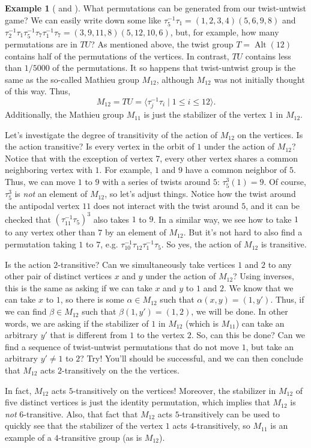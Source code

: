 \documentclass[11pt]{amsart}
\theoremstyle{plain}
\theoremstyle{definition}
\newtheorem{example}{Example}
\theoremstyle{remark}
\DeclareMathOperator{\Alt}{Alt}
\begin{document}
\begin{example}[{\cite[Section~18 of Chapter~11]{CoSl99} and \cite{NaB-Icosa}}]
What permutations can be generated from our twist-untwist game? We can easily write down some like $\tau_5^{-1}\tau_1 = (1,2,3,4)(5,6,9,8)$ and $\tau_2^{-1}\tau_1\tau_5^{-1}\tau_7\tau_1^{-1}\tau_7 = (3,9,11,8)(5,12,10,6)$, but, for example, how many permutations are in $TU$? As mentioned above, the twist group $T = \Alt(12)$ contains half of the permutations of the vertices. In contrast, $TU$ contains less than $1/5000$ of the permutations. It so happens that twist-untwist group is the same as the so-called Mathieu group $M_{12}$, although $M_{12}$ was not initially thought of this way. Thus,  
 \[M_{12} = TU = \langle \tau_j^{-1}\tau_i \mid 1\le i\le 12\rangle.\]
Additionally, the Mathieu group $M_{11}$ is just the stabilizer of the vertex $1$ in $M_{12}$.

Let's investigate the degree of transitivity of the action of $M_{12}$ on the vertices. Is the action transitive? Is every vertex in the orbit of $1$ under the action of $M_{12}$? Notice that with the exception of vertex $7$, every other vertex shares a common neighboring vertex with $1$. For example, $1$ and $9$ have a common neighbor of $5$. Thus, we can move $1$ to $9$ with a series of twists around $5$: $\tau_5^3(1) = 9$. Of course, $\tau_5^3$ is \emph{not} an element of $M_{12}$, so let's adjust things. Notice how the twist around the antipodal vertex $11$ does not interact with the twist around $5$, and it can be checked that $(\tau_{11}^{-1}\tau_5)^3$ also takes $1$ to $9$. In a similar way, we see how to take $1$ to any vertex other than $7$ by an element of $M_{12}$. But it's not hard to also find a permutation taking $1$ to $7$, e.g. $\tau_{10}^{-1}\tau_{12}\tau_1^{-1}\tau_5$. So yes, the action of $M_{12}$ is transitive.

Is the action $2$-transitive? Can we simultaneously take vertices $1$ and $2$ to any other pair of distinct vertices $x$ and $y$ under the action of $M_{12}$? Using inverses, this is the same as asking if we can take $x$ and $y$ to $1$ and $2$. We know that we can take $x$ to $1$, so there is some $\alpha \in M_{12}$ such that $\alpha(x,y) = (1,y')$. Thus, if we can find $\beta \in M_{12}$ such that $\beta(1,y') = (1,2)$, we will be done. In other words, we are asking if the stabilizer of $1$ in $M_{12}$ (which is $M_{11}$) can take an arbitrary $y'$ that is different from $1$ to the vertex $2$. So, can this be done? Can we find a sequence of twist-untwist permutations that do not move $1$, but take an arbitrary $y'\neq 1$ to  $2$? Try! You'll should be successful, and we can then conclude that $M_{12}$ acts $2$-transitively on the the vertices.

In fact, $M_{12}$ acts $5$-transitively on the vertices! Moreover, the stabilizer in $M_{12}$ of five distinct vertices is just the identity permutation, which implies that  $M_{12}$ is \emph{not} $6$-transitive. Also, that fact that $M_{12}$ acts $5$-transitively can be used to quickly see that the stabilizer of the vertex $1$ acts $4$-transitively, so $M_{11}$ is an example of a $4$-transitive group (as is $M_{12}$).
\end{example}
\end{document}
